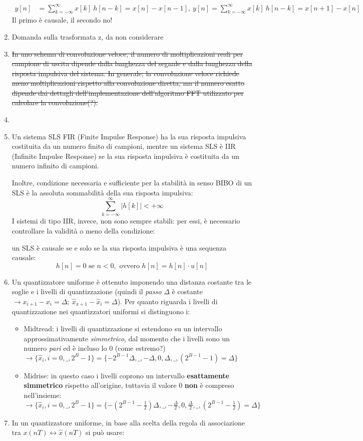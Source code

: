 \documentclass[
]{article}
\begin{document}
\begin{enumerate}
\begin{align*}
  y[n] &= \sum_{k=-\infty}^{\infty}x[k] \ h[n-k] = x[n] - x[n-1], \ y[n] = \sum_{k=-\infty}^{\infty}x[k] \ h[n-k] = x[n+1] - x[n] 
  \end{align*} Il primo è causale, il secondo no!
\item
  Domanda sulla trasformata z, da non considerare
\item
  \st{In uno schema di convoluzione veloce, il numero di moltiplicazioni
  reali per campione di uscita dipende dalla lunghezza del segnale e
  dalla lunghezza della risposta impulsiva del sistema. In generale, la
  convoluzione veloce richiede meno moltiplicazioni rispetto alla
  convoluzione diretta, ma il numero esatto dipende dai dettagli
  dell'implementazione dell'algoritmo FFT utilizzato per calcolare la
  convoluzione(?).}
\item
\item
  Un sistema SLS FIR (Finite Impulse Response) ha la sua risposta
  impulsiva costituita da un numero finito di campioni, mentre un
  sistema SLS è IIR (Infinite Impulse Response) se la sua risposta
  impulsiva è costituita da un numero infinito di campioni.

  Inoltre, condizione necessaria e sufficiente per la stabilità in senso
  BIBO di un SLS è la assoluta sommabilità della sua risposta impulsiva:
  \[
  \sum_{k=-\infty}^{\infty}\Big|h[k]\Big| < +\infty
  \] I sistemi di tipo IIR, invece, non sono sempre stabili: per essi, è
  necessario controllare la validità o meno della condizione:

  un SLS è causale se e solo se la sua risposta impulsiva è una sequenza
  causale: \[
  h[n] = 0 \text{ se } n < 0, \text{ ovvero } h[n] = h[n] \cdot u[n]
  \]
\item
  Un quantizzatore uniforme è ottenuto imponendo una distanza costante
  tra le soglie e i livelli di quantizzazione (quindi il \emph{passo}
  \(\Delta\) è costante
  \(\to x_{i+1}-x_i=\Delta; \ \hat{x}_{x+1}-\hat{x}_i = \Delta\)). Per
  quanto riguarda i livelli di quantizzazione nei quantizzatori uniformi
  si distinguono i:

  \begin{itemize}
  \item
    Midtread: i livelli di quantizzazione si estendono su un intervallo
    approssimativamente \emph{simmetrico}, dal momento che i livelli
    sono un numero \emph{pari} ed è incluso lo 0 (come estremo?)
    \(\to \{\hat{x}_i,i=0,\_,2^B -1\}= \{-2^{B-1}\Delta,\_,-\Delta,0,\Delta,\_,(2^{B-1}-1)=\Delta \}\)
  \item
    Midrise: in questo caso i livelli coprono un intervallo
    \textbf{esattamente simmetrico} rispetto all'origine, tuttavia il
    valore 0 \textbf{non} è compreso
    nell'insieme:\(\to \{\hat{x}_i,i=0,\_,2^B -1\}= \{-(2^{B-1}-\frac{1}{2})\Delta,\_,-\frac{\Delta}{2},0,\frac{\Delta}{2},\_,(2^{B-1}-\frac{1}{2})=\Delta \}\)
  \end{itemize}
\item
  In un quantizzatore uniforme, in base alla scelta della regola di
  associazione tra \(x(nT)\leftrightarrow \hat{x}(nT)\) si può usare:


\end{enumerate}
\end{document}
